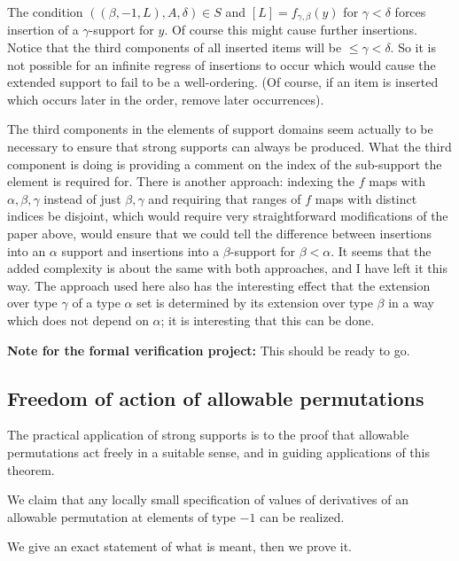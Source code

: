 \documentclass[112pt]{article}
\begin{document}
\begin{description}
The condition $((\beta,-1,L),A,\delta) \in S$ and $[L]=f_{\gamma,\beta}(y)$ for $\gamma<\delta$ forces insertion of a $\gamma$-support for $y$.  Of course this might cause further insertions.  Notice that
the third components of all inserted items will be $\leq \gamma <\delta$.  So it is not possible for an infinite regress of insertions to occur which would cause the extended support to fail to be a well-ordering.  (Of course, if an item is inserted which occurs later in the order, remove later occurrences).

\end{description}

The third components in the elements of support domains seem actually to be necessary to ensure that strong supports can always be produced.  What the third component is doing is providing a comment on the index of the sub-support the element is required for.   There is another approach:  indexing the $f$ maps with $\alpha,\beta,\gamma$ instead of just $\beta,\gamma$ and requiring that ranges of $f$ maps with distinct indices be disjoint, which would require very straightforward modifications of the paper above, would ensure that we could tell the difference between insertions into an $\alpha$ support and insertions into a $\beta$-support for $\beta<\alpha$.  It seems that the added complexity is about the same with both approaches, and I have left it this way.  The approach used here also has the interesting effect that the extension over type $\gamma$ of a type $\alpha$ set is determined by its extension over type $\beta$ in a way which does not depend on $\alpha$;  it is interesting that this can be done.


{\bf Note for the formal verification project:}  This should be ready to go.
\newpage
\subsection{Freedom of action of allowable permutations}

The practical application of strong supports is to the proof that allowable permutations act freely in a suitable sense, and in guiding applications of this theorem.

We claim that any locally small specification of values of derivatives of an allowable permutation at elements of type $-1$ can be realized.

We give an exact statement of what is meant, then we prove it.
\end{document}

